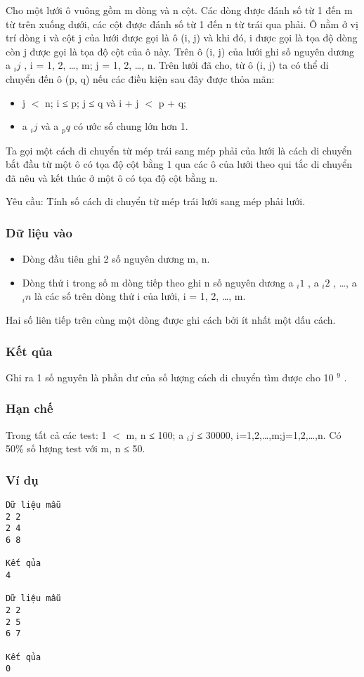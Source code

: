 



   Cho một lưới ô vuông gồm m dòng và n cột. Các dòng được đánh số từ 1 đến m từ trên xuống dưới, các cột được đánh số từ 1 đến n từ trái qua phải. Ô nằm ở vị trí dòng i và cột j của lưới được gọi là ô   (i, j) và khi đó, i được gọi là tọa độ dòng còn j được gọi là tọa độ cột của ô này. Trên ô (i, j) của lưới ghi số nguyên dương a   $_    ij   $   , i = 1, 2, …, m; j = 1, 2, …, n. Trên lưới đã cho, từ ô (i, j) ta có thể   di chuyển đến ô (p, q) nếu các điều kiện sau đây được thỏa mãn:  
\begin{itemize}
	\item     j $<$ n; i ≤ p; j ≤ q và i + j $<$ p + q;   
	\item     a    $_     ij    $    và a    $_     pq    $    có ước số chung lớn hơn 1.   
\end{itemize}

   Ta gọi một cách di chuyển từ mép trái sang mép phải của lưới là cách di chuyển bắt đầu từ một ô có tọa độ cột bằng 1 qua các ô của lưới theo qui tắc di chuyển đã nêu và kết thúc ở một ô có tọa độ cột   bằng n.  

   Yêu cầu: Tính số cách di chuyển từ mép trái lưới sang mép phải lưới.  

\subsubsection{   Dữ liệu vào  }
\begin{itemize}
	\item     Dòng đầu tiên ghi 2 số nguyên dương m, n.   
	\item     Dòng thứ i trong số m dòng tiếp theo ghi n số nguyên dương a    $_     i1    $    , a    $_     i2    $    , …, a    $_     in    $    là các số trên dòng thứ i của lưới, i = 1, 2, …, m.   
\end{itemize}

   Hai số liên tiếp trên cùng một dòng được ghi cách bởi ít nhất một dấu cách.  

\subsubsection{   Kết qủa  }

   Ghi ra 1 số nguyên là phần dư của số lượng cách di chuyển tìm được cho 10   $^    9   $   .  

\subsubsection{   Hạn chế  }

   Trong tất cả các test: 1 $<$ m, n ≤ 100; a   $_    ij   $   ≤ 30000, i=1,2,…,m;j=1,2,…,n. Có 50\% số lượng test với m, n ≤ 50.  

\subsubsection{   Ví dụ  }
\begin{verbatim}
Dữ liệu mẫu
2 2
2 4
6 8

Kết qủa
4

Dữ liệu mẫu
2 2
2 5
6 7

Kết qủa
0
\end{verbatim}